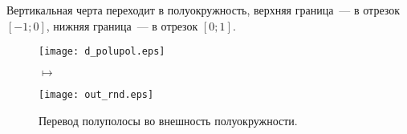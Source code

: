 Вертикальная черта переходит в полуокружность, верхняя граница~--- в отрезок
$[-1;0]$, нижняя граница~--- в отрезок $[0;1]$.
\Example
~
\\
\begin{figure}[h!]
    \begin{minipage}[c]{0.45\textwidth}
        \centering
        \texttt{[image: d\_polupol.eps]}
    \end{minipage}
    \begin{minipage}[c]{0.1\textwidth}
        \centering
        \LARGE{$\mapsto$}
    \end{minipage}
    \begin{minipage}[c]{0.45\textwidth}
        \centering
        \texttt{[image: out\_rnd.eps]}
    \end{minipage}
    \label{fig:24.7}
    \caption{Перевод полуполосы во внешность полуокружности.}
\end{figure}
